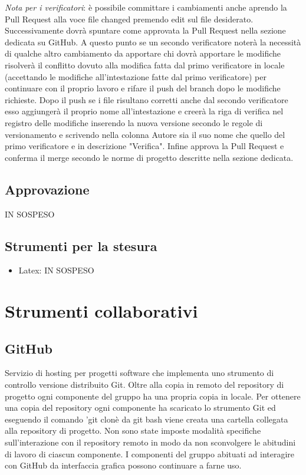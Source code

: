 \textit{Nota per i verificatori}: è possibile committare i cambiamenti anche aprendo la Pull Request alla voce file changed premendo 
edit sul file desiderato.
Successivamente dovrà spuntare come approvata la Pull Request nella sezione dedicata su GitHub. 
A questo punto se un secondo verificatore noterà la necessità di qualche altro cambiamento da apportare chi dovrà apportare le modifiche risolverà il conflitto
dovuto alla modifica fatta dal primo verificatore in locale (accettando le modifiche all'intestazione fatte dal primo verificatore) per continuare con il proprio lavoro e rifare il push del branch
dopo le modifiche richieste.
Dopo il push se i file risultano corretti anche dal secondo verificatore esso aggiungerà il proprio nome all'intestazione e creerà la riga di verifica
nel registro delle modifiche inserendo la nuova versione secondo le regole di versionamento e scrivendo nella colonna Autore sia il suo nome
che quello del primo verificatore e in descrizione "Verifica".
Infine approva la Pull Request e conferma il merge secondo le norme di progetto descritte nella sezione dedicata.

\subsection{Approvazione}
IN SOSPESO
\subsection{Strumenti per la stesura}
\begin{itemize} 
    \item Latex: IN SOSPESO
\end{itemize}

\section{Strumenti collaborativi}
\subsection{GitHub}
Servizio di hosting per progetti software che implementa uno strumento di controllo versione distribuito Git.
Oltre alla copia in remoto del repository di progetto ogni componente del gruppo ha una propria copia in locale.
Per ottenere una copia del repository ogni componente ha scaricato lo strumento Git ed eseguendo il 
comando 'git clonè da git bash viene creata una cartella collegata alla repository di progetto.
Non sono state imposte modalità specifiche sull'interazione con il repository remoto in modo da non sconvolgere le abitudini di lavoro di 
ciascun componente.
I componenti del gruppo abituati ad interagire con GitHub da interfaccia grafica possono continuare a farne uso.
